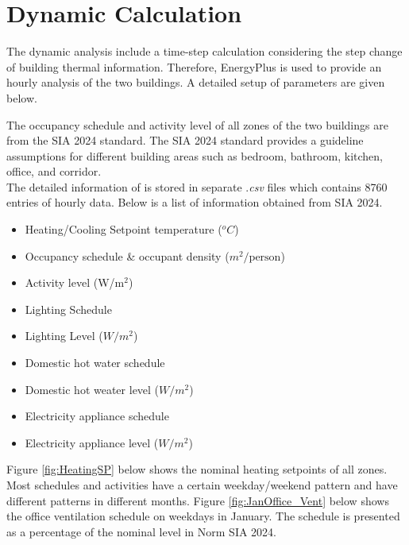 \documentclass[a4paper, oneside]{discothesis}
\begin{document}
		
	\section{Dynamic Calculation}
		The dynamic analysis include a time-step calculation considering the step change of building thermal information. Therefore, EnergyPlus is used to provide an hourly analysis of the two buildings. A detailed setup of parameters are given below.
		
		The occupancy schedule and activity level of all zones of the two buildings are from the SIA 2024 standard. The SIA 2024 standard provides a guideline assumptions for different building areas such as bedroom, bathroom, kitchen, office, and corridor.\\

		The detailed information of is stored in separate .\textit{csv} files which contains 8760 entries of hourly data. Below is a list of information obtained from SIA 2024.

	\begin{itemize}
		\item Heating/Cooling Setpoint temperature ($^oC$)
		\item Occupancy schedule \& occupant density ($m^2/\text{person}$)
		\item Activity level (W/m$^2$)
		\item Lighting Schedule
		\item Lighting Level ($W/m^2$)
		\item Domestic hot water schedule 
		\item Domestic hot weater level ($W/m^2$)
		\item Electricity appliance schedule
		\item Electricity appliance level ($W/m^2$)
	\end{itemize}


		Figure \ref{fig:HeatingSP} below shows the nominal heating setpoints of all zones. Most schedules and activities have a certain weekday/weekend pattern and have different patterns in different months. Figure \ref{fig:JanOffice_Vent} below shows the office ventilation schedule on weekdays in January. The schedule is presented as a percentage of the nominal level in Norm SIA 2024.\\
		
\end{document}
